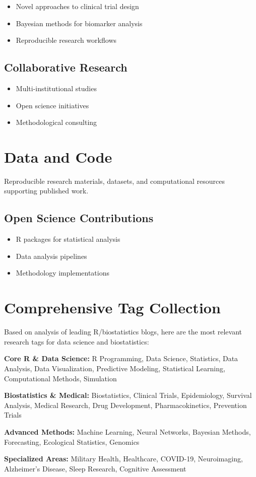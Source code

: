 \documentclass[
  letterpaper,
  DIV=11,
  numbers=noendperiod]{scrartcl}
\providecommand{\tightlist}{%
  \setlength{\itemsep}{0pt}\setlength{\parskip}{0pt}}\usepackage{longtable,booktabs,array}
\begin{document}
\begin{itemize}
\tightlist
\item
  Novel approaches to clinical trial design
\item
  Bayesian methods for biomarker analysis
\item
  Reproducible research workflows
\end{itemize}

\subsection{Collaborative Research}\label{collaborative-research}

\begin{itemize}
\tightlist
\item
  Multi-institutional studies
\item
  Open science initiatives
\item
  Methodological consulting
\end{itemize}

\section{Data and Code}\label{data-and-code}

Reproducible research materials, datasets, and computational resources
supporting published work.

\subsection{Open Science
Contributions}\label{open-science-contributions}

\begin{itemize}
\tightlist
\item
  R packages for statistical analysis
\item
  Data analysis pipelines
\item
  Methodology implementations
\end{itemize}

\section{Comprehensive Tag
Collection}\label{comprehensive-tag-collection}

Based on analysis of leading R/biostatistics blogs, here are the most
relevant research tags for data science and biostatistics:

\textbf{Core R \& Data Science:} R Programming, Data Science,
Statistics, Data Analysis, Data Visualization, Predictive Modeling,
Statistical Learning, Computational Methods, Simulation

\textbf{Biostatistics \& Medical:} Biostatistics, Clinical Trials,
Epidemiology, Survival Analysis, Medical Research, Drug Development,
Pharmacokinetics, Prevention Trials

\textbf{Advanced Methods:} Machine Learning, Neural Networks, Bayesian
Methods, Forecasting, Ecological Statistics, Genomics

\textbf{Specialized Areas:} Military Health, Healthcare, COVID-19,
Neuroimaging, Alzheimer's Disease, Sleep Research, Cognitive Assessment
\end{document}
